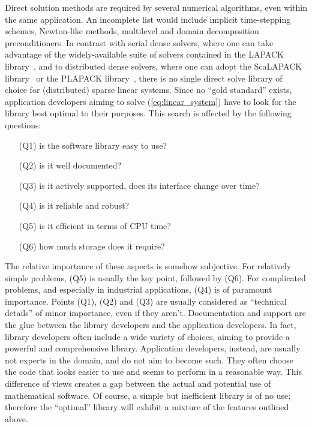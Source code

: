 \documentclass[acmtocl]{acmtrans2m}
\begin{document}
\smallskip

Direct solution methods are required by several numerical algorithms, even
within the same application. An
incomplete list would include implicit time-stepping schemes, 
Newton-like methods, multilevel and domain decomposition preconditioners. 
In contrast with serial dense solvers, where one can take advantage of the
widely-available suite of solvers contained in the LAPACK
library~\cite{lapack-guide}, and to distributed dense solvers, where one can
adopt the ScaLAPACK library~\cite{scalapack-guide} or the PLAPACK
library~\cite{alpatov97plapack}, there is no single direct solve library of
choice for (distributed) sparse linear systems.  Since no ``gold
standard'' exists, application developers aiming to solve
(\ref{eq:linear_system}) have to look
for the library best optimal to their purposes. This search is affected by the following questions:
\begin{enumerate}
\item[(Q1)] is the software library easy to use?
\item[(Q2)] is it well documented?
\item[(Q3)] is it actively supported, does its interface change over time?
\item[(Q4)] is it reliable and robust?
\item[(Q5)] is it efficient in terms of CPU time?
\item[(Q6)] how much storage does it require?
\end{enumerate}
The relative importance of these aspects is somehow subjective. For relatively
simple problems, (Q5) is usually the key point, followed by (Q6). For
complicated problems, and especially in industrial applications, (Q4) is of
paramount importance. Points (Q1), (Q2) and (Q3) are usually considered as
``technical details'' of minor importance, even if they aren't. Documentation
and support are the glue between the library developers and the application
developers. In fact, library developers often include a wide variety
of choices, aiming to provide a powerful and comprehensive library.
Application developers, instead, are usually not experts in the domain, and do
not aim to become such. They often choose the code that looks easier to use and
seems to perform in a reasonable way. This difference of views creates a gap between
the actual and potential use of mathematical software.
Of course, a simple but inefficient library is of no use; therefore the
``optimal'' library will exhibit a mixture of the features outlined above.
\end{document}

